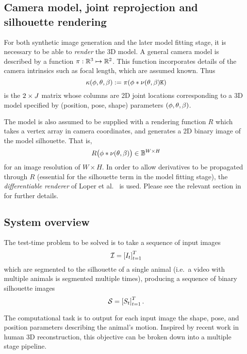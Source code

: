 \subsection{Camera model, joint reprojection and silhouette rendering}
For both synthetic image generation and the later model fitting stage, it is necessary to be able to \emph{render} the 3D model. A general camera model is described by a function $\pi: {\mathbb{R}^{3}} \mapsto {\mathbb{R}^{2}}$.  This function incorporates details of the camera intrinsics such as focal length, which are assumed known.  
Thus 
\begin{equation} \label{eq:project_joints}
\kappa(\phi, \theta, \beta) := \pi(\phi * \nu(\theta, \beta) \mathtt{K})
\end{equation}
is the $2\times J$ matrix whose columns are 2D joint locations corresponding to a 3D model specified by (position, pose, shape) parameters $(\phi, \theta, \beta)$.

The model is also assumed to be supplied with a rendering function $R$ which takes a vertex array in camera coordinates, and generates a 2D binary image of the model silhouette.  That is,
\begin{equation} \label{eq:render_sil}
R\bigl(\phi * \nu(\theta, \beta)\bigr) \in \mathbb{B}^{W\times H}
\end{equation}
for an image resolution of $W \times H$.  In order to allow derivatives to be propagated through $R$ (essential for the silhouette term in the model fitting stage), the \emph{differentiable renderer} of Loper et al.~\cite{loper2014opendr} is used. Please see the relevant section in  for further details.

\subsection{System overview}

The test-time problem to be solved is to take a sequence of input images
\[
\mathcal{I} = \left[{I_{t}}\right]_{t=1}^{T}
\]
which are segmented to the silhouette of a single animal (i.e.~a video with multiple animals is segmented multiple times), producing a sequence of binary silhouette images 
\[
\mathcal{S} = \left[{S_{t}}\right]_{t=1}^{T}.
\]

The computational task is to output for each input image the shape, pose, and position parameters describing the animal's motion. Inspired by recent work in human 3D reconstruction, this objective can be broken down into a multiple stage pipeline. 

